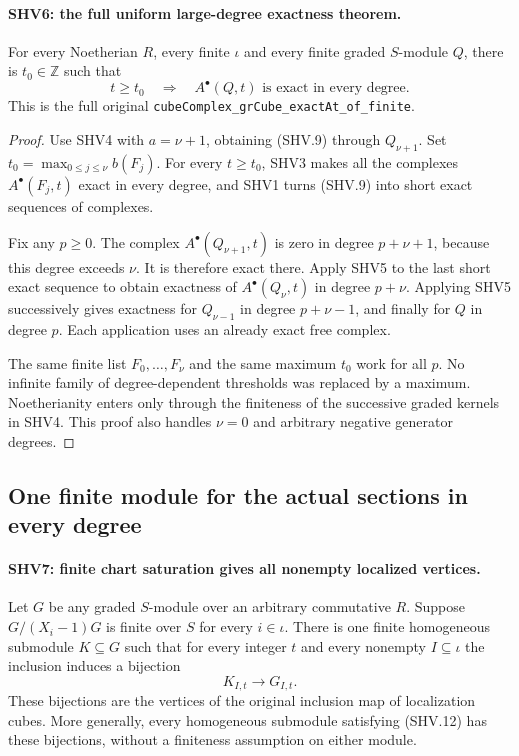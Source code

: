 \documentclass[11pt,a4paper]{article}
\numberwithin{equation}{section}
\theoremstyle{remark}\newtheorem{remark}[theorem]{Remark}
\begin{document}
\paragraph{SHV6: the full uniform large-degree exactness theorem.}
\label{claim:SHV6}
For every Noetherian $R$, every finite $\iota$ and every finite
graded $S$-module $Q$, there is $t_0\in\mathbb Z$ such that
\[
 t\ge t_0\quad\Longrightarrow\quad
          A^\bullet(Q,t)\text{ is exact in every degree}.
                                                        \tag{SHV.10}
\]
This is the full original
\texttt{cube\allowbreak Complex\_\allowbreak gr\allowbreak Cube\_\allowbreak exact\allowbreak At\_\allowbreak of\_\allowbreak finite}.

\begin{proof}
Use SHV4 with $a=\nu+1$, obtaining (SHV.9) through $Q_{\nu+1}$.
Set
$t_0=\max_{0\le j\le\nu} b(F_j)$.
For every $t\ge t_0$, SHV3 makes all the complexes
$A^\bullet(F_j,t)$ exact in every degree, and SHV1 turns
(SHV.9) into short exact sequences of complexes.

Fix any $p\ge0$.  The complex $A^\bullet(Q_{\nu+1},t)$ is
zero in degree $p+\nu+1$, because this degree exceeds $\nu$.
It is therefore exact there.  Apply SHV5 to the last short exact
sequence to obtain exactness of $A^\bullet(Q_\nu,t)$ in
degree $p+\nu$.  Applying SHV5 successively gives exactness for
$Q_{\nu-1}$ in degree $p+\nu-1$, and finally for $Q$ in degree
$p$.  Each application uses an already exact free complex.

The same finite list $F_0,\ldots,F_\nu$ and the same maximum
$t_0$ work for all $p$.  No infinite family of degree-dependent
thresholds was replaced by a maximum.  Noetherianity enters only
through the finiteness of the successive graded kernels in SHV4.
This proof also handles $\nu=0$ and arbitrary negative generator
degrees.
\end{proof}

\subsection{One finite module for the actual sections in every degree}

\paragraph{SHV7: finite chart saturation gives all nonempty localized vertices.}
\label{claim:SHV7}
Let $G$ be any graded $S$-module over an arbitrary commutative $R$.
Suppose $G/(X_i-1)G$ is finite over $S$ for every $i\in\iota$.
There is one finite homogeneous submodule $K\subseteq G$ such that
for every integer $t$ and every nonempty $I\subseteq\iota$ the
inclusion induces a bijection
\[
                    K_{I,t}\longrightarrow G_{I,t}.
                                                        \tag{SHV.11}
\]
These bijections are the vertices of the original inclusion map
of localization cubes.  More generally, every homogeneous submodule
satisfying (SHV.12) has these bijections, without a finiteness
assumption on either module.
\end{document}
